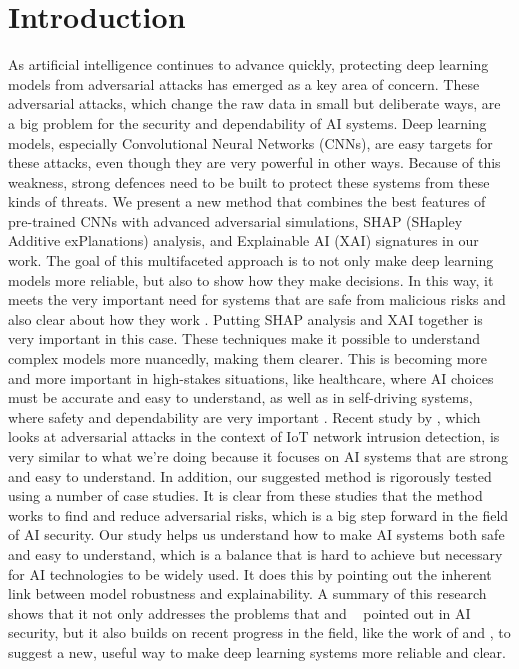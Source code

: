 \documentclass[10pt, conference, a4paper, final]{IEEEtran}
\begin{document}
\section{Introduction}
As artificial intelligence continues to advance quickly, protecting deep learning models
from adversarial attacks has emerged as a key area of concern. These adversarial attacks, 
which change the raw data in small but deliberate ways, are a big problem for the security 
and dependability of AI systems. Deep learning models, especially Convolutional Neural 
Networks (CNNs), are easy targets for these attacks, even though they are very powerful 
in other ways. Because of this weakness, strong defences need to be built to protect these 
systems from these kinds of threats.
\cite {Akhtar}
We present a new method that combines the best features of pre-trained CNNs with advanced 
adversarial simulations, SHAP (SHapley Additive exPlanations) analysis, and Explainable AI (XAI) 
signatures in our work. The goal of this multifaceted approach is to not only make deep learning 
models more reliable, but also to show how they make decisions. In this way, it meets the very 
important need for systems that are safe from malicious risks and also clear about how they work \cite {Lee, Morris, Croce}.
Putting SHAP analysis and XAI together is very important in this case. These techniques make it possible 
to understand complex models more nuancedly, making them clearer. This is becoming more and more important 
in high-stakes situations, like healthcare, where AI choices must be accurate and easy to understand, as well
 as in self-driving systems, where safety and dependability are very important \cite {Zhou}. 
Recent study by \cite {Zhou}, which looks at adversarial attacks in the context of IoT network intrusion
 detection, is very similar to what we're doing because it focuses on AI systems that are strong and easy to understand.
In addition, our suggested method is rigorously tested using a number of case studies. It is clear from these 
studies that the method works to find and reduce adversarial risks, which is a big step forward in the field of AI security. Our study helps us understand how to make AI systems both safe and easy to understand, which is a balance that is hard to achieve but necessary for AI technologies to be widely used. It does this by pointing out the inherent link between model robustness and explainability.
A summary of this research shows that it not only addresses the problems that \cite {Akhtar} and \cite {Dong} 
pointed out in AI security, but it also builds on recent progress in the field, like the work of \cite {Morris} and 
\cite {Croce} , to suggest a new, useful way to make deep learning systems more reliable and clear.
\end{document}
